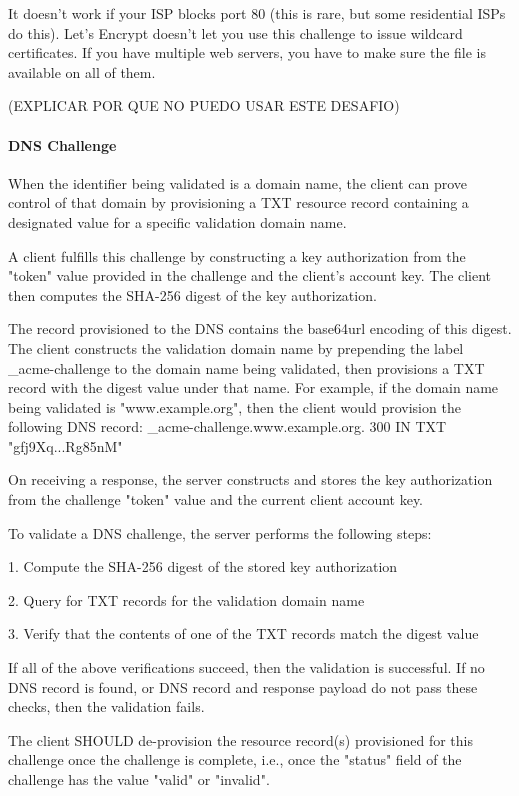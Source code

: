     It doesn’t work if your ISP blocks port 80 (this is rare, but some residential ISPs do this).
    Let’s Encrypt doesn’t let you use this challenge to issue wildcard certificates.
    If you have multiple web servers, you have to make sure the file is available on all of them.

   (EXPLICAR POR QUE NO PUEDO USAR ESTE DESAFIO)

\paragraph{DNS Challenge}
   When the identifier being validated is a domain name, the client can
   prove control of that domain by provisioning a TXT resource record
   containing a designated value for a specific validation domain name.

   A client fulfills this challenge by constructing a key authorization
   from the "token" value provided in the challenge and the client's
   account key.  The client then computes the SHA-256 digest 
   of the key authorization.

   The record provisioned to the DNS contains the base64url encoding of
   this digest.  The client constructs the validation domain name by
   prepending the label {\_acme-challenge} to the domain name being
   validated, then provisions a TXT record with the digest value under
   that name.  For example, if the domain name being validated is
   "www.example.org", then the client would provision the following DNS
   record:
   \_acme-challenge.www.example.org. 300 IN TXT "gfj9Xq...Rg85nM"
   
   On receiving a response, the server constructs and stores the key
   authorization from the challenge "token" value and the current client
   account key.

   To validate a DNS challenge, the server performs the following steps:

   1.  Compute the SHA-256 digest of the stored key
       authorization

   2.  Query for TXT records for the validation domain name

   3.  Verify that the contents of one of the TXT records match the
       digest value

   If all of the above verifications succeed, then the validation is
   successful.  If no DNS record is found, or DNS record and response
   payload do not pass these checks, then the validation fails.

   The client SHOULD de-provision the resource record(s) provisioned for
   this challenge once the challenge is complete, i.e., once the
   "status" field of the challenge has the value "valid" or "invalid".
